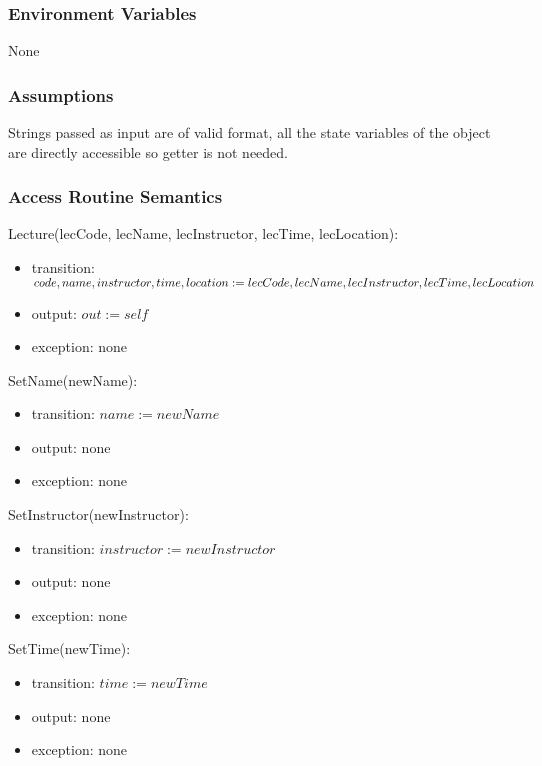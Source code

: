 \documentclass[12pt, titlepage]{article}
\begin{document}
\subsubsection{Environment Variables}

None

\subsubsection{Assumptions}

Strings passed as input are of valid format, all the state variables of the object are directly accessible so getter is not needed.

\subsubsection{Access Routine Semantics}

\noindent Lecture(lecCode, lecName, lecInstructor, lecTime, lecLocation):
\begin{itemize}
\item transition: $code, name, instructor, time, location := \\ lecCode, lecName, lecInstructor, lecTime, lecLocation$
\item output: $out := self$
\item exception: none
\end{itemize}

\noindent SetName(newName):
\begin{itemize}
\item transition: $name := newName$
\item output: none
\item exception: none
\end{itemize}

\noindent SetInstructor(newInstructor):
\begin{itemize}
\item transition: $instructor := newInstructor$
\item output: none
\item exception: none
\end{itemize}

\noindent SetTime(newTime):
\begin{itemize}
\item transition: $time := newTime$
\item output: none
\item exception: none
\end{itemize}
\end{document}

